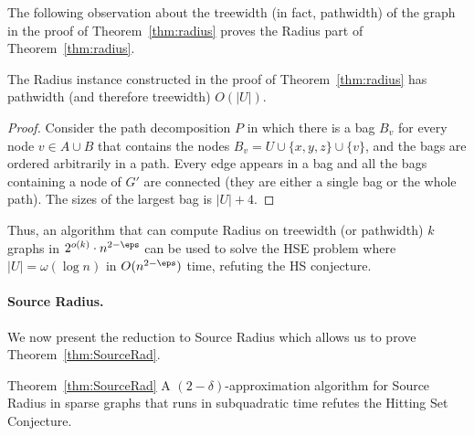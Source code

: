 The following observation about the treewidth (in fact, pathwidth) of the graph in the proof of Theorem~\ref{thm:radius} proves the Radius part of Theorem~\ref{thm:radius}.

\begin{claim}
The Radius instance constructed in the proof of Theorem~\ref{thm:radius} has pathwidth (and therefore treewidth) $O(|U|)$.
\end{claim}

\begin{proof}
Consider the path decomposition $P$ in which there is a bag $B_v$ for every node $v \in A\cup B$ that contains the nodes $B_v = U \cup \{x,y,z\} \cup \{v\}$, and the bags are ordered arbitrarily in a path.
Every edge appears in a bag and all the bags containing a node of $G'$ are connected (they are either a single bag or the whole path).
The sizes of the largest bag is $|U|+4$.
\end{proof}

Thus, an algorithm that can compute Radius on treewidth (or pathwidth) $k$ graphs in $2^{o(k)}\cdot n^{2-\eps}$ can be used to solve the HSE problem where $|U|=\omega(\log{n})$ in $O(n^{2-\eps})$ time, refuting the HS conjecture.


\paragraph{Source Radius.} We now present the reduction to Source Radius which allows us to prove Theorem~\ref{thm:SourceRad}.

\begin{reminder}{Theorem~\ref{thm:SourceRad}}
A $(2-\delta)$-approximation algorithm for Source Radius in sparse graphs that runs in subquadratic time refutes the Hitting Set Conjecture.
\end{reminder}

